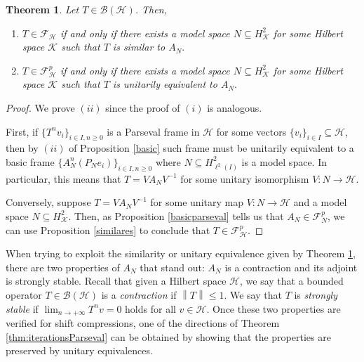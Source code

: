 \documentclass[a4paper,12pt]{amsart}
\def\cB{{\mathcal{B}}}
\def\cF{{\mathcal{F}}}
\def\HH{{\mathcal{H}}}
\def\KK{{\mathcal{K}}}
\def\cF{{\mathcal{F}}}
\newcommand{\norm}[1]{{\left\|{#1}\right\|}}
\newtheorem{theorem}{Theorem}[section]
\theoremstyle{definition}
\begin{document}
\begin{theorem}\label{cms}
Let $T\in\cB(\HH)$. Then,
\begin{enumerate}[label=(\roman*),ref=(\roman*)]
\item $T\in\cF_{\HH}$ if and only if there exists a model space $N\subseteq H^2_\KK$ for some Hilbert space $\KK$ such that $T$ is  similar to $A_N.$

\item $T\in\cF^{p}_\HH$ if and only if there exists a model space $N\subseteq H^2_\KK$ for some Hilbert space $\KK$ such that $T$ is  unitarily equivalent to $A_N.$
\end{enumerate}
\end{theorem}
\begin{proof}
We prove $(ii)$ since the proof of $(i)$ is  analogous. 

First, if $\{T^nv_i\}_{i\in I,n\geqslant0}$ is a Parseval frame in $\HH$ for some vectors $\{v_i\}_{i\in I}\subseteq\HH$, then by $(ii)$ of Proposition \ref{basic} such frame must be unitarily equivalent to a basic frame $\{A_N^n(P_Ne_i)\}_{i\in I,n\geqslant0}$ where $N\subseteq H^2_{\ell^2(I)}$ is a model space. In particular, this means that $T=VA_NV^{-1}$ for some unitary isomorphism $V:N\to\HH$.

Conversely, suppose $T=VA_NV^{-1}$ for some unitary map $V:N\to\HH$ and a model space $N\subseteq H^2_\KK$. Then, as Proposition \ref{basicparseval} tells us that $A_N\in\cF^p_N$, we can use Proposition \ref{similares} to conclude that $T\in\cF^p_\HH$. 
\end{proof}

When trying to exploit the similarity or unitary equivalence given by Theorem \ref{cms}, there are two properties of $A_N$ that stand out: $A_N$ is a contraction and its adjoint is strongly stable. Recall that given a Hilbert space $\HH$, we say that a bounded operator $T\in\cB(\HH)$ is a {\em contraction} if $\norm{T}\leqslant1$. We say that $T$ is {\em strongly stable} if $\lim_{n\to+\infty}T^nv=0$ holds for all $v\in\HH$. Once these two properties are verified for shift compressions, one of the directions of Theorem \ref{thm:iterationsParseval} can be obtained by showing that the properties are preserved by unitary equivalences.
\end{document}
